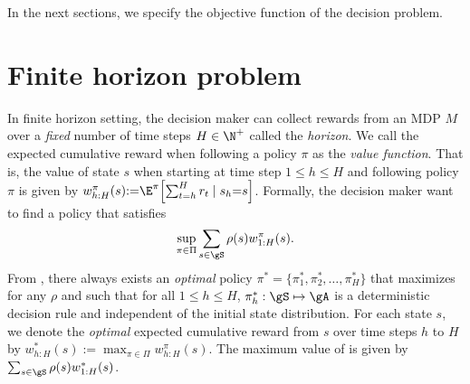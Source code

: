 In the next sections, we specify the objective function of the decision problem.


\section{Finite horizon problem}
\label{ch:mdp:sec:finite}


In finite horizon setting, the decision maker can collect rewards from an MDP $M$ over a \emph{fixed} number of time steps $H\in\N^+$ called the \emph{horizon}.
We call the expected cumulative reward when following a policy $\pi$ as the \emph{value function}.
That is, the value of state $s$ when starting at time step $1\le h\le H$ and following policy $\pi$ is given by $w_{h:H}^\pi(s){:=}\E^\pi\Bigl[\sum_{t=h}^H r_t\mid s_h{=}s\Bigr]$.
Formally, the decision maker want to find a policy that satisfies
\begin{equation}
    \label{eq:finite_obj}
    \sup_{\pi\in\Pi}\sum_{s\in\gS}\rho(s)w_{1:H}^\pi(s).
\end{equation}
From \cite[Chapter~4]{puterman2014markov}, there always exists an \emph{optimal} policy $\pi^*=\{\pi_1^*,\pi_2^*,\dots,\pi^*_H\}$ that maximizes  for any $\rho$ and such that for all $1\le h\le H$, $\pi_h^*:\gS\mapsto\gA$ is a deterministic decision rule and independent of the initial state distribution.
For each state $s$, we denote the \emph{optimal} expected cumulative reward from $s$ over time steps $h$ to $H$ by $w_{h:H}^{*}(s){:=}\max_{\pi\in\Pi}w_{h:H}^\pi(s)$.
The maximum value of  is given by $\sum_{s\in\gS}\rho(s)w_{1:H}^*(s)$.

